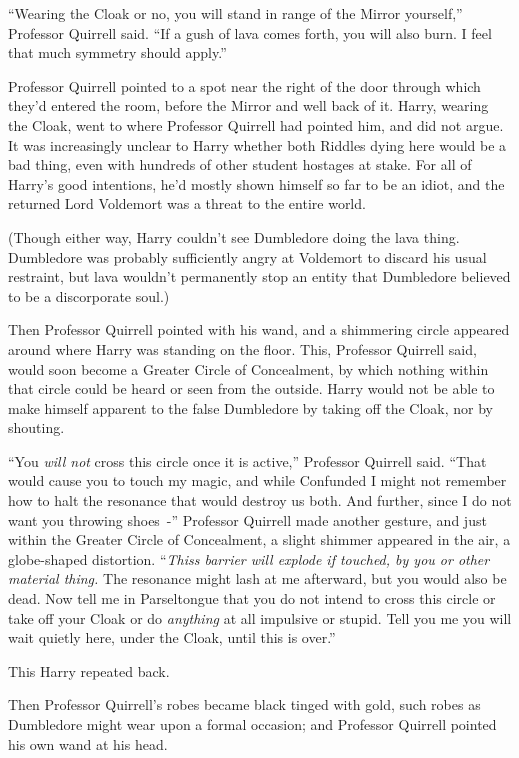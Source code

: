 ``Wearing the Cloak or no, you will stand in range of the Mirror yourself,'' Professor Quirrell said. ``If a gush of lava comes forth, you will also burn. I feel that much symmetry should apply.''

Professor Quirrell pointed to a spot near the right of the door through which they'd entered the room, before the Mirror and well back of it. Harry, wearing the Cloak, went to where Professor Quirrell had pointed him, and did not argue. It was increasingly unclear to Harry whether both Riddles dying here would be a bad thing, even with hundreds of other student hostages at stake. For all of Harry's good intentions, he'd mostly shown himself so far to be an idiot, and the returned Lord Voldemort was a threat to the entire world.

(Though either way, Harry couldn't see Dumbledore doing the lava thing. Dumbledore was probably sufficiently angry at Voldemort to discard his usual restraint, but lava wouldn't permanently stop an entity that Dumbledore believed to be a discorporate soul.)

Then Professor Quirrell pointed with his wand, and a shimmering circle appeared around where Harry was standing on the floor. This, Professor Quirrell said, would soon become a Greater Circle of Concealment, by which nothing within that circle could be heard or seen from the outside. Harry would not be able to make himself apparent to the false Dumbledore by taking off the Cloak, nor by shouting.

``You \emph{will not} cross this circle once it is active,'' Professor Quirrell said. ``That would cause you to touch my magic, and while Confunded I might not remember how to halt the resonance that would destroy us both. And further, since I do not want you throwing shoes~-'' Professor Quirrell made another gesture, and just within the Greater Circle of Concealment, a slight shimmer appeared in the air, a globe-shaped distortion. ``\emph{Thiss barrier will explode if touched, by you or other material thing.} The resonance might lash at me afterward, but you would also be dead. Now tell me in Parseltongue that you do not intend to cross this circle or take off your Cloak or do \emph{anything} at all impulsive or stupid. Tell you me you will wait quietly here, under the Cloak, until this is over.''

This Harry repeated back.

Then Professor Quirrell's robes became black tinged with gold, such robes as Dumbledore might wear upon a formal occasion; and Professor Quirrell pointed his own wand at his head.

